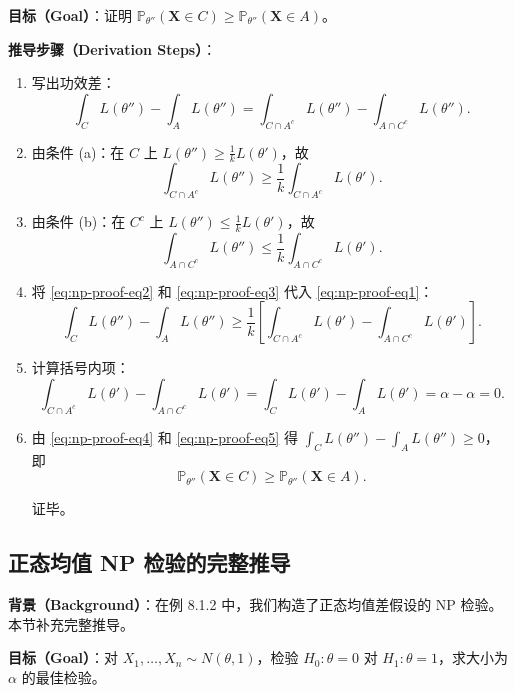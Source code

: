 \textbf{目标（Goal）}：证明 $\mathbb{P}_{\theta''}(\mathbf{X} \in C) \geq \mathbb{P}_{\theta''}(\mathbf{X} \in A)$。

\textbf{推导步骤（Derivation Steps）}：

\begin{enumerate}
\item 写出功效差：
\[
\int_C L(\theta'') - \int_A L(\theta'') = \int_{C \cap A^c} L(\theta'') - \int_{A \cap C^c} L(\theta'').
\label{eq:np-proof-eq1}
\]

\item 由条件 (a)：在 $C$ 上 $L(\theta'') \geq \frac{1}{k}L(\theta')$，故
\[
\int_{C \cap A^c} L(\theta'') \geq \frac{1}{k} \int_{C \cap A^c} L(\theta').
\label{eq:np-proof-eq2}
\]

\item 由条件 (b)：在 $C^c$ 上 $L(\theta'') \leq \frac{1}{k}L(\theta')$，故
\[
\int_{A \cap C^c} L(\theta'') \leq \frac{1}{k} \int_{A \cap C^c} L(\theta').
\label{eq:np-proof-eq3}
\]

\item 将 \cref{eq:np-proof-eq2} 和 \cref{eq:np-proof-eq3} 代入 \cref{eq:np-proof-eq1}：
\[
\int_C L(\theta'') - \int_A L(\theta'') \geq \frac{1}{k}\left[\int_{C \cap A^c} L(\theta') - \int_{A \cap C^c} L(\theta')\right].
\label{eq:np-proof-eq4}
\]

\item 计算括号内项：
\[
\int_{C \cap A^c} L(\theta') - \int_{A \cap C^c} L(\theta') = \int_C L(\theta') - \int_A L(\theta') = \alpha - \alpha = 0.
\label{eq:np-proof-eq5}
\]

\item 由 \cref{eq:np-proof-eq4} 和 \cref{eq:np-proof-eq5} 得 $\int_C L(\theta'') - \int_A L(\theta'') \geq 0$，即
\[
\mathbb{P}_{\theta''}(\mathbf{X} \in C) \geq \mathbb{P}_{\theta''}(\mathbf{X} \in A).
\]

证毕。
\end{enumerate}

\subsection{正态均值 NP 检验的完整推导}\label{sec:normal-np-derivation}

\textbf{背景（Background）}：在例 8.1.2 中，我们构造了正态均值差假设的 NP 检验。本节补充完整推导。

\textbf{目标（Goal）}：对 $X_1, \ldots, X_n \sim N(\theta, 1)$，检验 $H_0: \theta = 0$ 对 $H_1: \theta = 1$，求大小为 $\alpha$ 的最佳检验。

